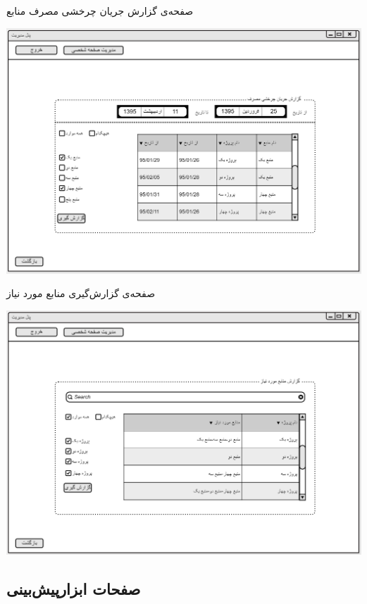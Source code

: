 \documentclass{article}
\begin{document}
\vspace{1cm}
صفحه‌ی گزارش جریان چرخشی مصرف منابع
\begin{center}
\includegraphics[width=\textwidth]{Prototype/Reporting/ResourceUsageReport.png}
\end{center}

\newpage
\vspace{1cm}
صفحه‌ی گزارش‌گیری منابع مورد نیاز
\begin{center}
\includegraphics[width=\textwidth]{Prototype/Reporting/ResourceRequirementsReport.png}
\end{center}

\newpage
\subsection{صفحات ابزارپیش‌بینی }
\end{document}
